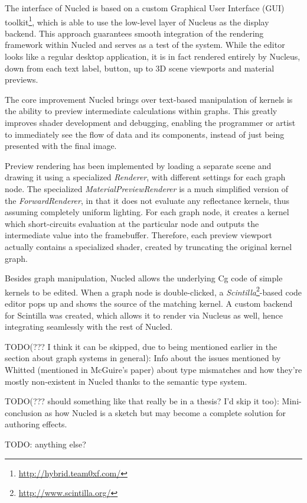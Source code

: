 The interface of Nucled is based on a custom Graphical User Interface (GUI) toolkit\footnote{\url{http://hybrid.team0xf.com/}}, which is able to use the low-level layer of Nucleus as the display backend. This approach guarantees smooth integration of the rendering framework within Nucled and serves as a test of the system. While the editor looks like a regular desktop application, it is in fact rendered entirely by Nucleus, down from each text label, button, up to 3D scene viewports and material previews.

The core improvement Nucled brings over text-based manipulation of kernels is the ability to preview intermediate calculations within graphs. This greatly improves shader development and debugging, enabling the programmer or artist to immediately see the flow of data and its components, instead of just being presented with the final image.

Preview rendering has been implemented by loading a separate scene and drawing it using a specialized \emph{Renderer}, with different settings for each graph node. The specialized \emph{MaterialPreviewRenderer} is a much simplified version of the \emph{ForwardRenderer}, in that it does not evaluate any reflectance kernels, thus assuming completely uniform lighting. For each graph node, it creates a kernel which short-circuits evaluation at the particular node and outputs the intermediate value into the framebuffer. Therefore, each preview viewport actually contains a specialized shader, created by truncating the original kernel graph.

Besides graph manipulation, Nucled allows the underlying Cg code of simple kernels to be edited. When a graph node is double-clicked, a \emph{Scintilla}\footnote{\url{http://www.scintilla.org/}}-based code editor pops up and shows the source of the matching kernel. A custom backend for Scintilla was created, which allows it to render via Nucleus as well, hence integrating seamlessly with the rest of Nucled.

TODO(??? I think it can be skipped, due to being mentioned earlier in the section about graph systems in general): Info about the issues mentioned by Whitted (mentioned in McGuire's paper) about type mismatches and how they're mostly non-existent in Nucled thanks to the semantic type system.

TODO(??? should something like that really be in a thesis? I'd skip it too): Mini-conclusion as how Nucled is a sketch but may become a complete solution for authoring effects.

TODO: anything else?